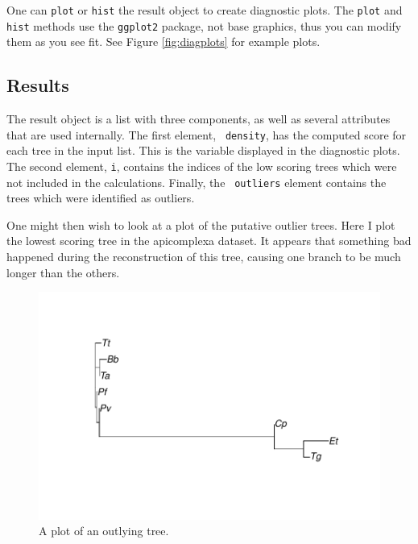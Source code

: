 \documentclass{article}
\begin{document}
One can {\tt plot} or {\tt hist} the result object to create
diagnostic plots. The {\tt plot} and {\tt hist} methods use the
{\tt ggplot2} package, not base graphics, thus you can modify them as
you see fit. See Figure \ref{fig:diagplots} for example plots.

\subsection{Results}
\label{sec:results}

The result object is a list with three components, as well as several
attributes that are used internally.  The first element, {\tt
  density}, has the computed score for each tree in the input
list. This is the variable displayed in the diagnostic plots. The
second element, {\tt i}, contains the indices of the low scoring trees
which were not included in the calculations. Finally, the {\tt
  outliers} element contains the trees which were identified as
outliers.

One might then wish to look at a plot of the putative outlier
trees. Here I plot the lowest scoring tree in the apicomplexa
dataset. It appears that something bad happened during the
reconstruction of this tree, causing one branch to be much longer
than the others.

  \begin{figure}[h]
    \centering
\begin{Schunk}
\end{Schunk}
\includegraphics{kdetrees-outlierplot}
    \caption{A plot of an outlying tree.}
    \label{fig:treeplot}
  \end{figure}
\end{document}
